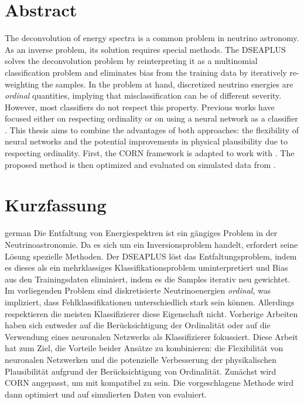 \thispagestyle{plain}

\section*{Abstract}
The deconvolution of energy spectra is a common problem in neutrino astronomy.
As an inverse problem,
  its solution requires special methods.
The \acf{DSEAPLUS} \cite{dsea_unification}
solves the deconvolution problem
  by reinterpreting it as a multinomial classification problem
and eliminates bias from the training data
  by iteratively re-weighting the samples.
%
In the problem at hand,
  discretized neutrino energies are \emph{ordinal} quantities,
    implying that misclassification can be of different severity.
However,
  most classifiers do not respect this property.
Previous works
have focused either
  on respecting ordinality \cite{dsea_jan}
  or on using a neural network as a classifier \cite{dsea_samuel}.
This thesis aims to combine the advantages of both approaches:
  the flexibility of neural networks
  and the potential improvements in physical plausibility
    due to respecting ordinality.
First,
the \ac{CORN} framework \cite{corn} is adapted to work with \dsea{}.
The proposed method is then optimized and evaluated
  on simulated data from \icecube{}.


\acresetall %
\section*{Kurzfassung}
\begin{foreignlanguage}{german}
Die Entfaltung von Energiespektren ist ein gängiges Problem in der Neutrinoastronomie.
Da es sich um ein Inversionsproblem handelt,
  erfordert seine Lösung spezielle Methoden.
Der \ac{DSEAPLUS} \cite{dsea_unification}
löst das Entfaltungsproblem,
  indem es dieses als ein mehrklassiges Klassifikationsproblem uminterpretiert
und Bias aus den Trainingsdaten eliminiert,
  indem es die Samples iterativ neu gewichtet.
%
Im vorliegenden Problem
  sind diskretisierte Neutrinoenergien \emph{ordinal},
    was impliziert, dass Fehlklassifikationen unterschiedlich stark sein können.
Allerdings
  respektieren die meisten Klassifizierer diese Eigenschaft nicht.
Vorherige Arbeiten
haben sich entweder
  auf die Berücksichtigung der Ordinalität \cite{dsea_jan}
  oder auf die Verwendung eines neuronalen Netzwerks als Klassifizierer \cite{dsea_samuel}
fokussiert.
Diese Arbeit hat zum Ziel,
  die Vorteile beider Ansätze zu kombinieren:
    die Flexibilität von neuronalen Netzwerken
    und die potenzielle Verbesserung der physikalischen Plausibilität
      aufgrund der Berücksichtigung von Ordinalität.
Zunächst wird \ac{CORN} \cite{corn} angepasst,
  um mit \dsea{} kompatibel zu sein.
Die vorgeschlagene Methode wird dann
  optimiert
  und auf simulierten Daten von \icecube{} evaluiert.
\end{foreignlanguage}

